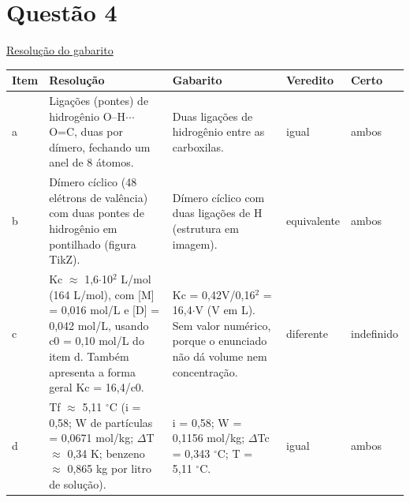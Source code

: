 \documentclass{article}%
\begin{document}
\section*{Questão 4}%
\href{https://poliedroresolve.sistemapoliedro.com.br/vestibulares/ime/2027/ime-2-fase-dia-3-28-10-2026-2-fase-dia-3/dissertativa-4-quimica-2-fase-dia-3-ime-2027}{Resolução do gabarito}\par\smallskip%
\begin{longtable}{@{}p{} p{} p{} p{} p{}@{}}\toprule Item & Resolução & Gabarito & Veredito & Certo \\ \midrule
a & Ligações (pontes) de hidrogênio O--H$\cdot$$\cdot$$\cdot$O=C, duas por dímero, fechando um anel de 8 átomos. & Duas ligações de hidrogênio entre as carboxilas. & igual & ambos \\
b & Dímero cíclico (48 elétrons de valência) com duas pontes de hidrogênio em pontilhado (figura TikZ). & Dímero cíclico com duas ligações de H (estrutura em imagem). & equivalente & ambos \\
c & Kc $\approx$ 1,6$\cdot$10$^2$ L/mol (164 L/mol), com {[}M{]} = 0,016 mol/L e {[}D{]} = 0,042 mol/L, usando c0 = 0,10 mol/L do item d. Também apresenta a forma geral Kc = 16,4/c0. & Kc = 0,42V/0,16$^2$ = 16,4$\cdot$V (V em L). Sem valor numérico, porque o enunciado não dá volume nem concentração. & diferente & indefinido \\
d & Tf $\approx$ 5,11 $^\circ$C (i = 0,58; W de partículas = 0,0671 mol/kg; $\Delta$T $\approx$ 0,34 K; benzeno $\approx$ 0,865 kg por litro de solução). & i = 0,58; W = 0,1156 mol/kg; $\Delta$Tc = 0,343 $^\circ$C; T = 5,11 $^\circ$C. & igual & ambos \\
\bottomrule\end{longtable}%
\end{document}
